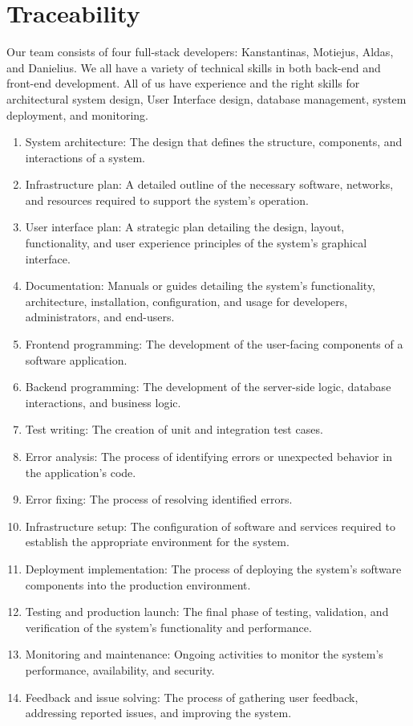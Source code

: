 \documentclass[
    english, %
]{VUMIFPSkursinis}
\begin{document}
\section{Traceability}

Our team consists of four full-stack developers: Kanstantinas, Motiejus, Aldas, and Danielius. We all have a variety of technical skills in both back-end and front-end development. All of us have experience and the right skills for architectural system design, User Interface design, database management, system deployment, and monitoring.

\begin{enumerate}[label=\arabic*.]
    \item System architecture: The design that defines the structure, components, and interactions of a system.
    \item Infrastructure plan: A detailed outline of the necessary software, networks, and resources required to support the system's operation.
    \item User interface plan: A strategic plan detailing the design, layout, functionality, and user experience principles of the system's graphical interface.
    \item Documentation: Manuals or guides detailing the system's functionality, architecture, installation, configuration, and usage for developers, administrators, and end-users.
    \item Frontend programming: The development of the user-facing components of a software application.
    \item Backend programming: The development of the server-side logic, database interactions, and business logic.
    \item Test writing: The creation of unit and integration test cases.
    \item Error analysis: The process of identifying errors or unexpected behavior in the application’s code.
    \item Error fixing: The process of resolving identified errors.
    \item Infrastructure setup: The configuration of software and services required to establish the appropriate environment for the system.
    \item Deployment implementation: The process of deploying the system's software components into the production environment.
    \item Testing and production launch: The final phase of testing, validation, and verification of the system's functionality and performance.
    \item Monitoring and maintenance: Ongoing activities to monitor the system's performance, availability, and security. 
    \item Feedback and issue solving: The process of gathering user feedback, addressing reported issues, and improving the system.
\end{enumerate}
\end{document}
